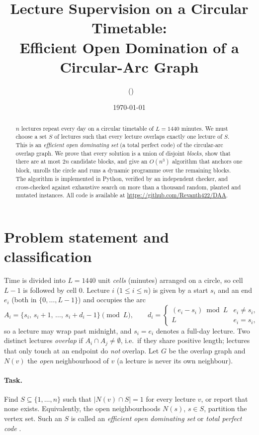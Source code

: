 \documentclass[11pt,a4paper]{article}
\title{Lecture Supervision on a Circular Timetable:\\
       Efficient Open Domination of a Circular-Arc Graph}
\author{\studentname\ (\rollno)\\[2pt] \coursename}
\date{\today}
\theoremstyle{definition}
\theoremstyle{remark}
\begin{document}
\maketitle

\begin{abstract}
\noindent $n$ lectures repeat every day on a circular timetable of $L=1440$ minutes.
We must choose a set $S$ of lectures such that every lecture overlaps exactly one
lecture of $S$.  This is an \emph{efficient open dominating set} (a total perfect
code) of the circular-arc overlap graph.  We prove that every solution is a union of
disjoint \emph{blocks}, show that there are at most $2n$ candidate blocks, and give
an $O(n^3)$ algorithm that anchors one block, unrolls the circle and runs a dynamic
programme over the remaining blocks.  The algorithm is implemented in Python,
verified by an independent checker, and cross-checked against exhaustive search on
more than a thousand random, planted and mutated instances.  All code is available at
\url{https://github.com/Revanth422/DAA}.
\end{abstract}

\tableofcontents

\section{Problem statement and classification}
Time is divided into $L=1440$ unit \emph{cells} (minutes) arranged on a circle, so
cell $L-1$ is followed by cell $0$.  Lecture $i$ ($1\le i\le n$) is given by a start
$s_i$ and an end $e_i$ (both in $\{0,\dots,L-1\}$) and occupies the arc
\[
  A_i=\{s_i,\,s_i+1,\,\dots,\,s_i+d_i-1\}\pmod L,\qquad
  d_i=\begin{cases}(e_i-s_i)\bmod L & e_i\ne s_i,\\ L & e_i=s_i,\end{cases}
\]
so a lecture may wrap past midnight, and $s_i=e_i$ denotes a full-day lecture.
Two distinct lectures \emph{overlap} if $A_i\cap A_j\neq\emptyset$, i.e.\ if they share
positive length; lectures that only touch at an endpoint do \emph{not} overlap.
Let $G$ be the overlap graph and $N(v)$ the \emph{open} neighbourhood of $v$ (a lecture
is never its own neighbour).

\paragraph{Task.} Find $S\subseteq\{1,\dots,n\}$ such that $|N(v)\cap S|=1$ for every
lecture $v$, or report that none exists.  Equivalently, the open neighbourhoods
$N(s)$, $s\in S$, partition the vertex set.  Such an $S$ is called an
\emph{efficient open dominating set} or \emph{total perfect code} \cite{cdh,gs}.
\end{document}
